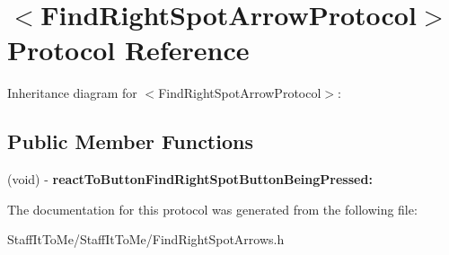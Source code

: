 \hypertarget{protocol_find_right_spot_arrow_protocol-p}{
\section{$<$\-Find\-Right\-Spot\-Arrow\-Protocol$>$ \-Protocol \-Reference}
\label{protocol_find_right_spot_arrow_protocol-p}
}


\-Inheritance diagram for $<$\-Find\-Right\-Spot\-Arrow\-Protocol$>$\-:
\subsection*{\-Public \-Member \-Functions}
\begin{DoxyCompactItemize}
\item 
\hypertarget{protocol_find_right_spot_arrow_protocol-p_a3cf8c00380a0b287528f18c653ed456a}{
(void) -\/ {\bfseries react\-To\-Button\-Find\-Right\-Spot\-Button\-Being\-Pressed\-:}}
\label{protocol_find_right_spot_arrow_protocol-p_a3cf8c00380a0b287528f18c653ed456a}

\end{DoxyCompactItemize}


\-The documentation for this protocol was generated from the following file\-:\begin{DoxyCompactItemize}
\item 
\-Staff\-It\-To\-Me/\-Staff\-It\-To\-Me/\-Find\-Right\-Spot\-Arrows.\-h\end{DoxyCompactItemize}

